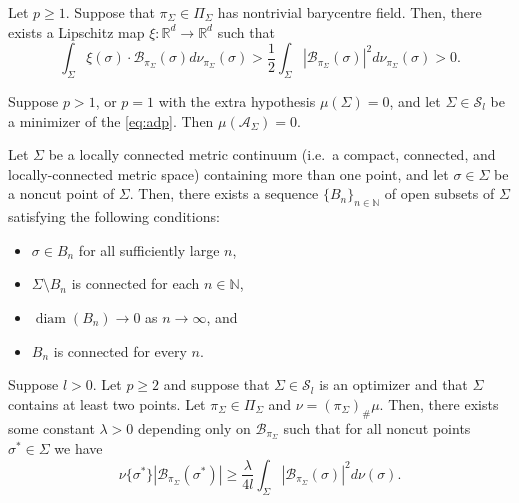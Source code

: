 \documentclass[10pt,a4paper]{amsart}
\DeclareMathOperator*{\diam}{diam}
\begin{document}
\begin{proposition}\label{approximatebysmooth}
  Let $p \geq 1$. Suppose that $\pi_{\Sigma} \in \Pi_\Sigma$ has
  nontrivial barycentre field. Then, there exists a Lipschitz map $\xi
  : \mathbb{R}^d \to \mathbb{R}^d$ such that
  \[
    \int_{\Sigma} \xi(\sigma) \cdot
    \mathcal{B}_{\pi_{\Sigma}}(\sigma) d \nu_{\pi_{\Sigma}}(\sigma) >
    \frac{1}{2}\int_{\Sigma}|\mathcal{B}_{\pi_{\Sigma}}(\sigma) |^2 d
    \nu_{\pi_{\Sigma}}(\sigma) > 0.
  \]
\end{proposition}

\begin{proposition}\label{ridgesetnegligable}
  Suppose $p > 1$, or $p=1$ with the extra hypothesis $\mu(\Sigma) =
  0$, and let $\Sigma \in \mathcal{S}_l$ be a minimizer of the
  \eqref{eq:adp}. Then $\mu(\mathcal{A}_{\Sigma}) = 0$.
\end{proposition}

\begin{lemma}\label{noncutneighbourhood}
  Let $\Sigma$ be a locally connected metric continuum (i.e.\ a
  compact, connected, and locally-connected metric space) containing
  more than one point, and let $\sigma \in \Sigma$ be a noncut point
  of $\Sigma$. Then, there exists a sequence $\{B_n\}_{n \in
    \mathbb{N}}$ of open subsets of $\Sigma$ satisfying the following
  conditions:
  \begin{itemize}
    \item[(i)] $\sigma \in B_n$ for all sufficiently large $n$,
    \item[(ii)] $\Sigma \setminus B_n$ is connected for each $n \in
      \mathbb{N}$,
    \item[(iii)] $\diam(B_n) \to 0$ as $n \to \infty$, and
    \item[(iv)] $B_n$ is connected for every $n$.
  \end{itemize}
\end{lemma}

\begin{theorem}\label{prop:boundingmassofnoncutpoints} Suppose $l > 0$.
  Let $p \geq 2$ and suppose that $\Sigma \in \mathcal{S}_l$ is an
  optimizer and that $\Sigma$ contains at least two points. Let
  $\pi_\Sigma \in \Pi_\Sigma$ and $\nu = (\pi_{\Sigma})_{\#}\mu$.
  Then, there exists some constant $\lambda > 0$ depending only on
  $\mathcal B_{\pi_\Sigma}$ such that for all noncut points $\sigma^*
  \in \Sigma$ we have
  \[
    \nu\{\sigma^*\}|\mathcal{B}_{\pi_{\Sigma}}(\sigma^*)| \geq
    \frac{\lambda }{4l} \int_{\Sigma}
    |\mathcal{B}_{\pi_{\Sigma}}(\sigma)|^2 d\nu(\sigma).
  \]
\end{theorem}
\end{document}
